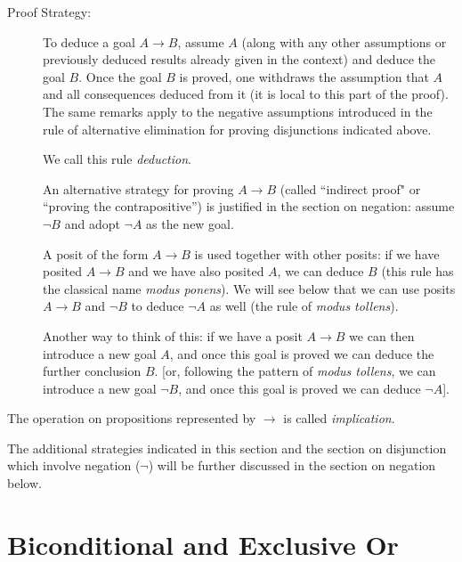 \documentclass[12pt]{book}
\begin{document}
\begin{description}

\item[Proof Strategy:] To deduce a goal $A \rightarrow B$, assume $A$
(along with any other assumptions or previously deduced results
already given in the context) and deduce the goal $B$.  Once the goal
$B$ is proved, one withdraws the assumption that $A$ and all consequences deduced from it (it is local to
this part of the proof).  The same remarks apply to the negative
assumptions introduced in the rule of alternative elimination for proving
disjunctions indicated above.  

We call this rule {\em deduction\/}.

An alternative strategy for proving $A
\rightarrow B$ (called ``indirect proof" or ``proving the contrapositive'') is justified in
the section on negation: assume $\neg B$ and adopt $\neg A$ as the new
goal.

A posit of the form $A \rightarrow B$ is used together with other
posits: if we have posited $A \rightarrow B$ and we have also posited
$A$, we can deduce $B$ (this rule has the classical name {\em modus
ponens\/}).  We will see below that we can use posits $A \rightarrow
B$ and $\neg B$ to deduce $\neg A$ as well (the rule of {\em modus
tollens}).

Another way to think of this: if we have a posit $A \rightarrow B$ we
can then introduce a new goal $A$, and once this goal is proved we can
deduce the further conclusion $B$.  [or, following the pattern of {\em
modus tollens\/}, we can introduce a new goal $\neg B$, and once this
goal is proved we can deduce $\neg A$].

\end{description}

The operation on propositions represented by $\rightarrow$ is called
{\em implication\/}.

The additional strategies indicated in this section and the section on
disjunction which involve negation ($\neg$) will be further discussed
in the section on negation below.

\section{Biconditional and Exclusive Or}
\end{document}
